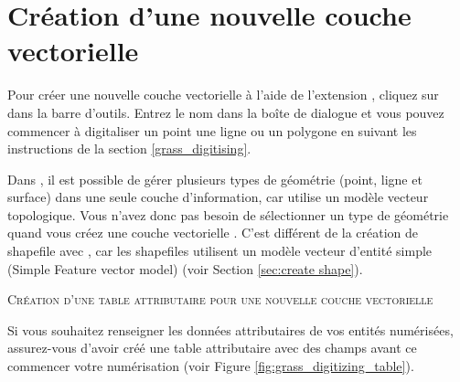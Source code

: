 {%
\section{Création d'une nouvelle couche vectorielle \grass}\label{sec:creating_new_grass_vectors}

Pour créer une nouvelle couche vectorielle \grass à l'aide de l'extension \grass, cliquez sur  dans la barre d'outils. Entrez le nom dans la boîte de dialogue et vous pouvez commencer à digitaliser un point une ligne ou un polygone en suivant les instructions de la section \ref{grass_digitising}.

Dans \grass, il est possible de gérer plusieurs types de géométrie (point, ligne et surface) dans une seule couche d'information, car \grass utilise un modèle vecteur topologique. Vous n'avez donc pas besoin de sélectionner un type de géométrie quand vous créez une couche vectorielle \grass. C'est différent de la création de shapefile avec \qg, car les shapefiles utilisent un modèle vecteur d'entité simple (Simple Feature vector model) (voir Section \ref{sec:create shape}).

\begin{Tip}\caption{\textsc{Création d'une table attributaire pour une nouvelle couche vectorielle \grass}}
Si vous souhaitez renseigner les données attributaires de vos entités numérisées, assurez-vous d'avoir créé une table attributaire avec des champs avant ce commencer votre numérisation (voir Figure \ref{fig:grass_digitizing_table}).
\end{Tip}

}
